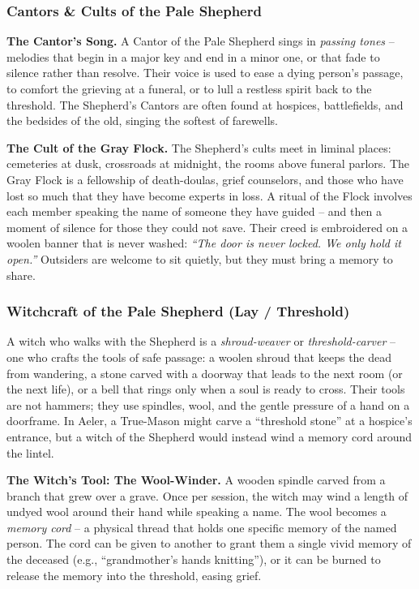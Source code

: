 \subsubsection*{Cantors \& Cults of the Pale Shepherd}

\textbf{The Cantor's Song.} A Cantor of the Pale Shepherd sings in \textit{passing tones} -- melodies that begin in a major key and end in a minor one, or that fade to silence rather than resolve. Their voice is used to ease a dying person's passage, to comfort the grieving at a funeral, or to lull a restless spirit back to the threshold. The Shepherd's Cantors are often found at hospices, battlefields, and the bedsides of the old, singing the softest of farewells.

\textbf{The Cult of the Gray Flock.} The Shepherd's cults meet in liminal places: cemeteries at dusk, crossroads at midnight, the rooms above funeral parlors. The Gray Flock is a fellowship of death-doulas, grief counselors, and those who have lost so much that they have become experts in loss. A ritual of the Flock involves each member speaking the name of someone they have guided -- and then a moment of silence for those they could not save. Their creed is embroidered on a woolen banner that is never washed: \textit{``The door is never locked. We only hold it open.''} Outsiders are welcome to sit quietly, but they must bring a memory to share.

\subsubsection*{Witchcraft of the Pale Shepherd (Lay / Threshold)}

A witch who walks with the Shepherd is a \textit{shroud-weaver} or \textit{threshold-carver} -- one who crafts the tools of safe passage: a woolen shroud that keeps the dead from wandering, a stone carved with a doorway that leads to the next room (or the next life), or a bell that rings only when a soul is ready to cross. Their tools are not hammers; they use spindles, wool, and the gentle pressure of a hand on a doorframe. In Aeler, a True-Mason might carve a ``threshold stone'' at a hospice's entrance, but a witch of the Shepherd would instead wind a memory cord around the lintel.

\textbf{The Witch's Tool: The Wool-Winder.} A wooden spindle carved from a branch that grew over a grave. Once per session, the witch may wind a length of undyed wool around their hand while speaking a name. The wool becomes a \textit{memory cord} -- a physical thread that holds one specific memory of the named person. The cord can be given to another to grant them a single vivid memory of the deceased (e.g., ``grandmother's hands knitting''), or it can be burned to release the memory into the threshold, easing grief.


